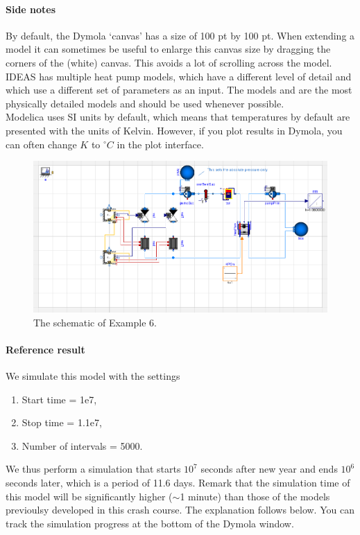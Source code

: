 \documentclass[10pt,a4paper]{article}
\begin{document}
\paragraph{Side notes}
By default, the Dymola `canvas' has a size of 100 pt by 100 pt. 
When extending a model  it can sometimes be useful to enlarge this canvas size by dragging
the corners of the (white) canvas. 
This avoids a lot of scrolling across the model.\\

IDEAS has multiple heat pump models, which have a different level of detail
and which use a different set of parameters as an input.
The models 
and  are
the most physically detailed models and should be used whenever possible.\\

Modelica uses SI units by default, which means that temperatures by default 
are presented with the units of Kelvin. However, if you plot results in Dymola, you can often change $K$ to $^{\circ}C$ in the plot interface. \\



\begin{figure}[h]
\centering
\includegraphics[width=\linewidth]{Schematic6.png}
\caption{The schematic of Example 6.}
\label{fig:sche}
\end{figure}

\paragraph{Reference result}
We simulate this model with the settings
\begin{enumerate}
\item Start time = 1e7,
\item Stop time = 1.1e7,
\item Number of intervals = 5000.
\end{enumerate}
We thus perform a simulation that starts $10^7$ seconds after new year and ends $10^6$
seconds later, which is a period of 11.6 days. Remark that the simulation time of this model will be significantly higher ($\sim$1 minute) than those of the models previoulsy developed in this crash course. The explanation follows below. You can track the simulation progress at the bottom of the Dymola window. \\
\end{document}
